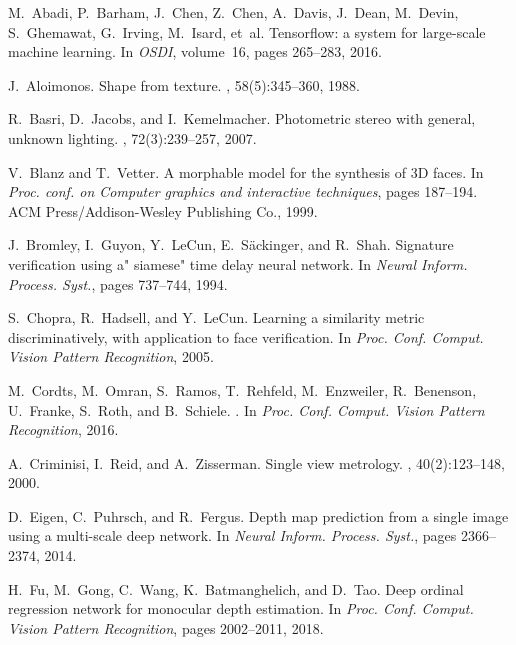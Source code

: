 \documentclass[10pt,twocolumn,letterpaper]{article}
\begin{document}
{\small

\begin{thebibliography}{10}\itemsep=-1pt

M.~Abadi, P.~Barham, J.~Chen, Z.~Chen, A.~Davis, J.~Dean, M.~Devin,
  S.~Ghemawat, G.~Irving, M.~Isard, et~al.
\newblock Tensorflow: a system for large-scale machine learning.
\newblock In {\em OSDI}, volume~16, pages 265--283, 2016.

J.~Aloimonos.
\newblock Shape from texture.
, 58(5):345--360, 1988.

R.~Basri, D.~Jacobs, and I.~Kemelmacher.
\newblock Photometric stereo with general, unknown lighting.
, 72(3):239--257, 2007.

V.~Blanz and T.~Vetter.
\newblock A morphable model for the synthesis of {3D} faces.
\newblock In {\em Proc. conf. on Computer graphics and interactive techniques},
  pages 187--194. ACM Press/Addison-Wesley Publishing Co., 1999.

J.~Bromley, I.~Guyon, Y.~LeCun, E.~S{\"a}ckinger, and R.~Shah.
\newblock Signature verification using a" siamese" time delay neural network.
\newblock In {\em Neural Inform. Process. Syst.}, pages 737--744, 1994.

S.~Chopra, R.~Hadsell, and Y.~LeCun.
\newblock Learning a similarity metric discriminatively, with application to
  face verification.
\newblock In {\em Proc. Conf. Comput. Vision Pattern Recognition}, 2005.

M.~Cordts, M.~Omran, S.~Ramos, T.~Rehfeld, M.~Enzweiler, R.~Benenson,
  U.~Franke, S.~Roth, and B.~Schiele.
.
\newblock In {\em Proc. Conf. Comput. Vision Pattern Recognition}, 2016.

A.~Criminisi, I.~Reid, and A.~Zisserman.
\newblock Single view metrology.
, 40(2):123--148, 2000.

D.~Eigen, C.~Puhrsch, and R.~Fergus.
\newblock Depth map prediction from a single image using a multi-scale deep
  network.
\newblock In {\em Neural Inform. Process. Syst.}, pages 2366--2374, 2014.

H.~Fu, M.~Gong, C.~Wang, K.~Batmanghelich, and D.~Tao.
\newblock Deep ordinal regression network for monocular depth estimation.
\newblock In {\em Proc. Conf. Comput. Vision Pattern Recognition}, pages
  2002--2011, 2018.


\end{thebibliography}}
\end{document}
